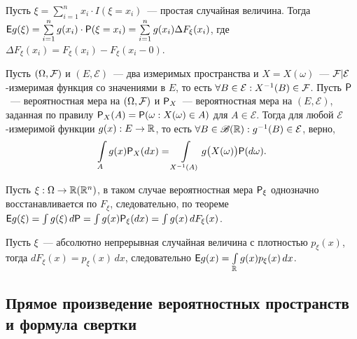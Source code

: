 Пусть $\xi = \sum\limits_{i = 1}^n x_i \cdot I (\xi = x_i)$~--- простая случайная величина. Тогда $\E g(\xi) = \sum\limits_{i=1}^{n} g(x_i) \cdot \P(\xi = x_i) = \sum\limits_{i = 1}^n g(x_i) \Delta F_\xi (x_i)$, где $\Delta F_\xi(x_i) = F_\xi(x_i) - F_\xi (x_i - 0)$.

\begin{theorem}
	Пусть $(\Omega, \F)$ и $(E, \mathcal{E})$~--- два измеримых пространства и $X = X(\omega)$~--- $\F | \mathcal{E}$-измеримая функция со значениями в $E$, то есть $\forall B \in \mathcal{E}: X^{-1}(B) \in \F$. Пусть $\P$~--- вероятностная мера на $(\Omega, \F)$ и $\P_X$~--- вероятностная мера на $(E, \mathcal{E})$, заданная по правилу $\P_X(A) = \P (\omega: X(\omega) \in A)$ для $A \in \mathcal{E}$. Тогда для любой $\mathcal{E}$-измеримой функции $g(x):E \rightarrow \R$, то есть $\forall B \in \B(\R): g^{-1}(B) \in \mathcal{E}$, верно, 
	$$\int\limits_A g(x) \P_X(dx) = \int\limits_{X^{-1}(A)} g\big( X(\omega) \big) \P(d \omega).$$
\end{theorem}

Пусть $\xi : \Omega \rightarrow \R (\R^n)$, в таком случае вероятностная мера $\P_\xi$ однозначно восстанавливается по $F_\xi$, следовательно, по теореме $\E g(\xi) = \int g(\xi) \, d\P = \int g(x) \P_\xi(dx) = \int g(x) \, d F_\xi (x)$.

Пусть  $\xi$~--- абсолютно непрерывная случайная величина с плотностью $p_\xi(x)$, тогда $d F_\xi (x) = p_\xi (x) \, dx$, следовательно $\E g(x) = \int\limits_{\R} g(x) p_\xi(x) \, d x$.

\subsection{Прямое произведение вероятностных пространств и формула свертки}

